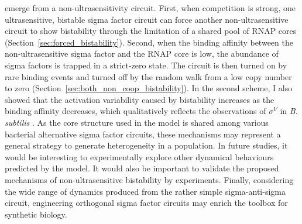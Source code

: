 emerge from a non-ultrasensitivity circuit.
First, when competition is strong, one ultrasensitive, bistable sigma factor
circuit can force another non-ultrasensitive circuit to show
bistability through the limitation of a shared pool of RNAP cores
(Section~\ref{sec:forced_bistability}).
Second, when the binding affinity between the non-ultrasensitive
sigma factor and the RNAP core is low,
the abundance of sigma factors is trapped in a strict-zero state.
The circuit is then turned on by rare binding events and turned off
by the random walk from a low copy number to zero
(Section~\ref{sec:both_non_coop_bistability}).
In the second scheme, I also showed that the activation variability caused by
bistability increases as the binding affinity decreases,
which qualitatively reflects the observations of $\sigma^V$ in 
\textit{B. subtilis} \cite{schwall21a}.
As the core structure used in the model is shared among various bacterial
alternative sigma factor circuits,
these mechanisms may represent a general strategy to generate 
heterogeneity in a population.
In future studies, it would be interesting to experimentally explore other
dynamical behaviours predicted by the model.
It would also be important to validate the proposed mechanisms of 
non-ultrasensitive bistability by experiments.
Finally, considering the wide range of dynamics produced from the
rather simple sigma-anti-sigma circuit, engineering orthogonal sigma factor
circuits may enrich the toolbox for synthetic biology.
